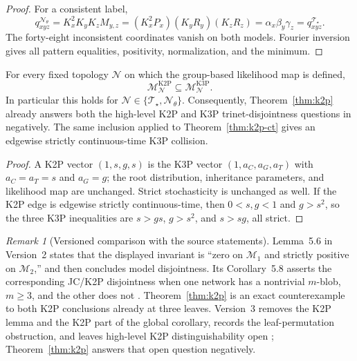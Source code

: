 \documentclass[11pt]{article}
\theoremstyle{remark}\newtheorem{remark}[theorem]{Remark}
\newcommand{\cM}{\mathcal M}\newcommand{\ThetaZero}{\Theta_0}\newcommand{\ThetaInterior}{\Theta_0^\circ}\newcommand{\KtwoP}{\mathrm{K2P}}\newcommand{\KthreeP}{\mathrm{K3P}}\newcommand{\odotv}{\mathbin{\odot}}\newcommand{\e}{\mathrm e}
\newcommand{\Tstar}{\mathcal T_\star}\newcommand{\Ntheta}{\mathcal N_\theta}
\begin{document}
\begin{proof}
For a consistent label,
\[
q^{\Ntheta}_{xyz}=K_x^2K_yK_zM_{y,z}=(K_x^2P_x)(K_yR_y)(K_zR_z)=\alpha_x\beta_y\gamma_z=q^{\Tstar}_{xyz}.
\]
The forty-eight inconsistent coordinates vanish on both models. Fourier inversion gives all pattern equalities, positivity, normalization, and the minimum.
\end{proof}
\begin{corollary}\label{cor:k2p-in-k3p}
For every fixed topology $\mathcal N$ on which the group-based likelihood map is defined,
\[
\cM^{\KtwoP}_{\mathcal N}\subseteq\cM^{\KthreeP}_{\mathcal N}.
\]
In particular this holds for $\mathcal N\in\{\Tstar,\Ntheta\}$. Consequently, Theorem~\ref{thm:k2p} already answers both the high-level K2P and K3P trinet-disjointness questions in \cite{BritsEtAl2026v3} negatively. The same inclusion applied to Theorem~\ref{thm:k2p-ct} gives an edgewise strictly continuous-time K3P collision.
\end{corollary}
\begin{proof}
A K2P vector $(1,s,g,s)$ is the K3P vector $(1,a_C,a_G,a_T)$ with $a_C=a_T=s$ and $a_G=g$; the root distribution, inheritance parameters, and likelihood map are unchanged. Strict stochasticity is unchanged as well. If the K2P edge is edgewise strictly continuous-time, then $0<s,g<1$ and $g>s^2$, so the three K3P inequalities are $s>gs$, $g>s^2$, and $s>sg$, all strict.
\end{proof}
\begin{remark}[Versioned comparison with the source statements]\label{rem:source}
Lemma~5.6 in Version~2 states that the displayed invariant is ``zero on $\mathcal M_1$ and strictly positive on $\mathcal M_2$,'' and then concludes model disjointness. Its Corollary~5.8 asserts the corresponding JC/K2P disjointness when one network has a nontrivial $m$-blob, $m\ge3$, and the other does not \cite{BritsEtAl2026v2}. Theorem~\ref{thm:k2p} is an exact counterexample to both K2P conclusions already at three leaves. Version~3 removes the K2P lemma and the K2P part of the global corollary, records the leaf-permutation obstruction, and leaves high-level K2P distinguishability open \cite{BritsEtAl2026v3}; Theorem~\ref{thm:k2p} answers that open question negatively.
\end{remark}
\end{document}
